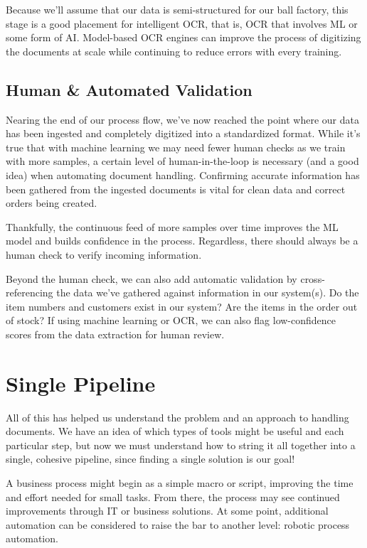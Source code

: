 \documentclass[conference]{IEEEtran}
\begin{document}
Because we'll assume that our data is semi-structured for our ball factory, this stage is a good placement for intelligent OCR, that is, OCR that involves ML or some form of AI. Model-based OCR engines can improve the process of digitizing the documents at scale while continuing to reduce errors with every training.

\subsection{Human \& Automated Validation}
Nearing the end of our process flow, we've now reached the point where our data has been ingested and completely digitized into a standardized format. While it's true that with machine learning we may need fewer human checks as we train with more samples, a certain level of human-in-the-loop is necessary (and a good idea) when automating document handling. Confirming accurate information has been gathered from the ingested documents is vital for clean data and correct orders being created.

Thankfully, the continuous feed of more samples over time improves the ML model and builds confidence in the process. Regardless, there should always be a human check to verify incoming information.

Beyond the human check, we can also add automatic validation by cross-referencing the data we've gathered against information in our system(s). Do the item numbers and customers exist in our system? Are the items in the order out of stock? If using machine learning or OCR, we can also flag low-confidence scores from the data extraction for human review.

\section{Single Pipeline} \label{sectionSinglePipeline}
All of this has helped us understand the problem and an approach to handling documents. We have an idea of which types of tools might be useful and each particular step, but now we must understand how to string it all together into a single, cohesive pipeline, since finding a single solution is our goal!

A business process might begin as a simple macro or script, improving the time and effort needed for small tasks. From there, the process may see continued improvements through IT or business solutions. At some point, additional automation can be considered to raise the bar to another level: robotic process automation.
\end{document}
